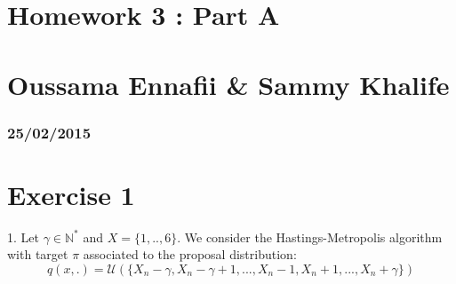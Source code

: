 


\geometry{hmargin=2.5cm,vmargin=2cm}   

	
	\section*{Homework 3 :  Part A}
	\section*{Oussama Ennafii \& Sammy Khalife}
	\subsubsection*{25/02/2015}
	
	\section*{Exercise 1}
	1. Let $\gamma \in \mathbb{N^*}$ and $X=\{1,..,6\}$. We consider the Hastings-Metropolis algorithm with target $\pi$ associated to the proposal distribution:
	$$q(x,.)=\mathcal{U}(\{X_n - \gamma, X_n-\gamma+1,..., X_n-1, X_n+1,...,X_n+\gamma\})$$~\\
	

